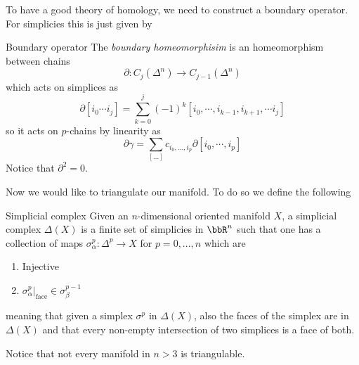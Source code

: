 To have a good theory of homology, we need to construct a boundary operator. For simplicies this is just given by 
\begin{defn}{Boundary operator}{}
	The \textit{boundary homeomorphisim} is an homeomorphism between chains
	\begin{equation}
		\partial:C_{j}(\Delta^{n})\rightarrow C_{j-1}(\Delta^{n})
	\end{equation}
	which acts on simplices as
	\begin{equation}
		\partial[i_{0}\cdots i_{j}]=\sum_{k=0}^{j}(-1)^{k}[i_{0},\cdots,i_{k-1},i_{k+1},\cdots i_{j}]
	\end{equation}
	so it acts on $p$-chains by linearity as
	\begin{equation}
		\partial\gamma=\sum_{[\ldots]}c_{i_{0},\ldots,i_{p}}\partial[i_{0},\cdots,i_{p}]
	\end{equation}
	Notice that $\partial^{2}=0$.
\end{defn}
Now we would like to triangulate our manifold. To do so we define the following
\begin{defn}{Simplicial complex}{}
	Given an $n$-dimensional oriented manifold $X$, a simplicial complex $\Delta (X)$ is a finite set of simplicies in $\bbR^{n}$ such that one has a collection of maps $\sigma_{\alpha}^{p}:\Delta^{p}\rightarrow X$ for $p=0,\ldots,n$ which are
	\begin{enumerate}
	\item Injective
	\item $\sigma_{\alpha}^{p}\Big |_{\text{face}}\in \sigma^{p-1}_{\beta}$
	\end{enumerate}
meaning that given a simplex $\sigma^{p}$ in $\Delta(X)$, also the faces of the simplex are in $\Delta(X)$ and that every non-empty intersection of two simplices is a face of both.
\end{defn}
Notice that not every manifold in $n>3$ is triangulable.\\

